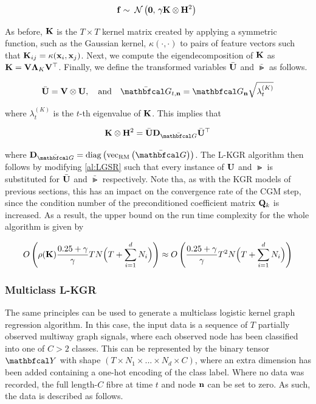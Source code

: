 \begin{equation}
    \mathbf{f} \sim \; \mathcal{N}\left(\mathbf{0}, \, \gamma \mathbf{K} \otimes \mathbf{H}^2\right) \;
\end{equation}

As before, $\mathbf{K}$ is the $T \times T$ kernel matrix created by applying a symmetric function, such as the Gaussian kernel, $\kappa(\cdot, \cdot)$ to pairs of feature vectors such that $\mathbf{K}_{ij} = \kappa(\mathbf{x}_i, \mathbf{x}_j)$. Next, we compute the eigendecomposition of $\mathbf{K}$ as $\mathbf{K} = \mathbf{V} \mathbf{\Lambda}_K \mathbf{V}^\top$. Finally, we define the transformed variables $\bar{\mathbf{U}}$ and $\bar{\Gt}$ as follows. 

\begin{equation}
    \label{eq:lkgr_substitution}
    \bar{\U}  = \V \otimes \U, \aand \bar{\Gt}_{t, \nn}  = \Gt_{\nn} \sqrt{\lambda_t^{(K)}}
\end{equation}

where $\lambda_t^{(K)}$ is the $t$-th eigenvalue of $\mathbf{K}$. This implies that 

\begin{equation}
    \K \otimes \HH^2 = \bar{\U} \D_{\bar{\Gt}} \bar{\U}^\top
\end{equation}

where $\D_{\bar{\Gt}} = \diag{\vecrm{\bar{\Gt}}}$. The L-KGR algorithm then follows by modifying \cref{al:LGSR} such that every instance of $\mathbf{U}$ and $\Gt$ is substituted for $\bar{\mathbf{U}}$ and $\bar{\Gt}$ respectively. Note tha, as with the KGR models of previous sections, this has an impact on the convergence rate of the CGM step, since the condition number of the preconditioned coefficient matrix $\mathbf{Q}_k$ is increased. As a result, the upper bound on the run time complexity for the whole algorithm is given by 

\begin{equation*}
    O\left(\rho(\mathbf{K})\frac{0.25 + \gamma}{\gamma} TN \Big(T + \sum_{i=1}^d N_i\Big) \right)  \approx O\left( \frac{0.25 + \gamma}{\gamma} T^2 N \Big(T + \sum_{i=1}^d N_i\Big) \right) 
\end{equation*}

\subsubsection{Multiclass L-KGR}

The same principles can be used to generate a multiclass logistic kernel graph regression algorithm. In this case, the input data is a sequence of $T $ partially observed multiway graph signals, where each observed node has been classified into one of $C > 2$ classes. This can be represented by the binary tensor $\Yt$ with shape $(T \times N_1 \times ... \times N_d \times C)$, where an extra dimension has been added containing a one-hot encoding of the class label. Where no data was recorded, the full length-$C$ fibre at time $t$ and node $\mathbf{n}$ can be set to zero. As such, the data is described as follows. 


